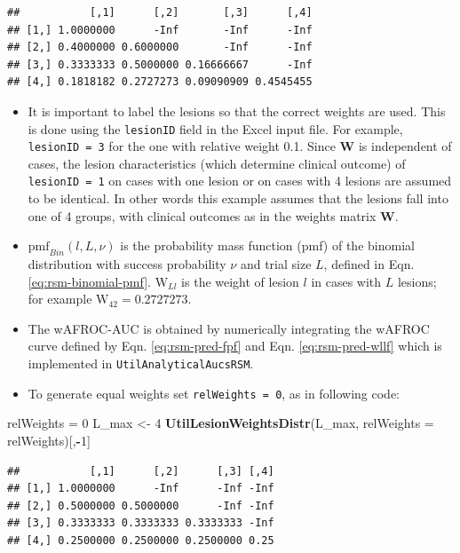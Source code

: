 \documentclass[
]{book}
\newenvironment{Shaded}{\begin{snugshade}}{\end{snugshade}}
\newcommand{\DataTypeTok}[1]{\textcolor[rgb]{0.13,0.29,0.53}{#1}}
\newcommand{\DecValTok}[1]{\textcolor[rgb]{0.00,0.00,0.81}{#1}}
\newcommand{\KeywordTok}[1]{\textcolor[rgb]{0.13,0.29,0.53}{\textbf{#1}}}
\newcommand{\NormalTok}[1]{#1}
\newcommand{\OperatorTok}[1]{\textcolor[rgb]{0.81,0.36,0.00}{\textbf{#1}}}
\newcommand{\StringTok}[1]{\textcolor[rgb]{0.31,0.60,0.02}{#1}}
\begin{document}
\begin{verbatim}
##           [,1]      [,2]       [,3]      [,4]
## [1,] 1.0000000      -Inf       -Inf      -Inf
## [2,] 0.4000000 0.6000000       -Inf      -Inf
## [3,] 0.3333333 0.5000000 0.16666667      -Inf
## [4,] 0.1818182 0.2727273 0.09090909 0.4545455
\end{verbatim}

\begin{itemize}
\item
  It is important to label the lesions so that the correct weights are used. This is done using the \texttt{lesionID} field in the Excel input file. For example, \texttt{lesionID\ =\ 3} for the one with relative weight 0.1. Since \(\mathbf{W}\) is independent of cases, the lesion characteristics (which determine clinical outcome) of \texttt{lesionID\ =\ 1} on cases with one lesion or on cases with 4 lesions are assumed to be identical. In other words this example assumes that the lesions fall into one of 4 groups, with clinical outcomes as in the weights matrix \(\mathbf{W}\).
\item
  \(\text{pmf}_{Bin}\left ( l, L, \nu \right )\) is the probability mass function (pmf) of the binomial distribution with success probability \(\nu\) and trial size \(L\), defined in Eqn. \eqref{eq:rsm-binomial-pmf}. \(\text{W}_{Ll}\) is the weight of lesion \(l\) in cases with \(L\) lesions; for example \(\text{W}_{42} = 0.2727273\).
\item
  The wAFROC-AUC is obtained by numerically integrating the wAFROC curve defined by Eqn. \eqref{eq:rsm-pred-fpf} and Eqn. \eqref{eq:rsm-pred-wllf} which is implemented in \texttt{UtilAnalyticalAucsRSM}.
\item
  To generate equal weights set \texttt{relWeights\ =\ 0}, as in following code:
\end{itemize}

\begin{Shaded}
\begin{Highlighting}[]
\NormalTok{relWeights =}\StringTok{  }\DecValTok{0}
\NormalTok{L_max <-}\StringTok{ }\DecValTok{4}
\KeywordTok{UtilLesionWeightsDistr}\NormalTok{(L_max, }\DataTypeTok{relWeights =}\NormalTok{ relWeights)[,}\OperatorTok{-}\DecValTok{1}\NormalTok{]}
\end{Highlighting}
\end{Shaded}

\begin{verbatim}
##           [,1]      [,2]      [,3] [,4]
## [1,] 1.0000000      -Inf      -Inf -Inf
## [2,] 0.5000000 0.5000000      -Inf -Inf
## [3,] 0.3333333 0.3333333 0.3333333 -Inf
## [4,] 0.2500000 0.2500000 0.2500000 0.25
\end{verbatim}
\end{document}

